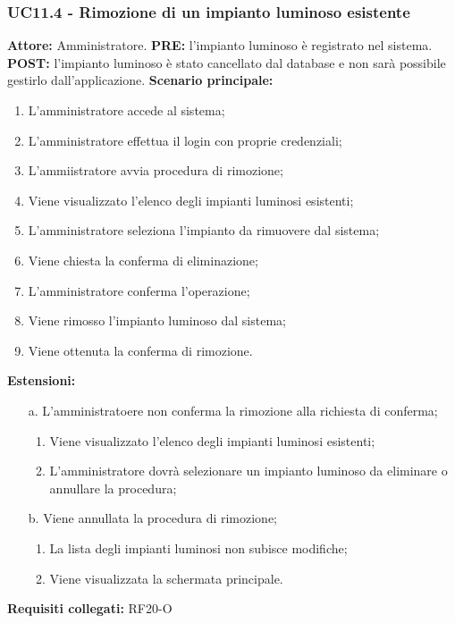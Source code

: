 \documentclass[a4paper, 12pt]{article}
\begin{document}
\subsubsection{UC11.4 - Rimozione di un impianto luminoso esistente}
\textbf{Attore:} Amministratore.\newline
\textbf{PRE:} l'impianto luminoso è registrato nel sistema.\newline
\textbf{POST:} l'impianto luminoso è stato cancellato dal database e non sarà possibile gestirlo dall'applicazione.\newline
\textbf{Scenario principale:}
\begin{enumerate}
    \item L'amministratore accede al sistema;
    \item L'amministratore effettua il login con proprie credenziali;
    \item L'ammiistratore avvia procedura di rimozione;
    \item Viene visualizzato l'elenco degli impianti luminosi esistenti;
    \item L'amministratore seleziona l'impianto da rimuovere dal sistema;
    \item Viene chiesta la conferma di eliminazione;
    \item L'amministratore conferma l'operazione;
    \item Viene rimosso l'impianto luminoso dal sistema;
    \item Viene ottenuta la conferma di rimozione.
\end{enumerate}
\textbf{Estensioni:}
\begin{itemize}
    \item [a.] L'amministratoere non conferma la rimozione alla richiesta di conferma;
    \begin{enumerate}
        \item Viene visualizzato l'elenco degli impianti luminosi esistenti;
        \item L'amministratore dovrà selezionare un impianto luminoso da eliminare o annullare la procedura;
    \end{enumerate}
    \item [b.] Viene annullata la procedura di rimozione;
    \begin{enumerate}
        \item La lista degli impianti luminosi non subisce modifiche;
        \item Viene visualizzata la schermata principale.
    \end{enumerate}
\end{itemize}
\textbf{Requisiti collegati:} RF20-O\newline
\end{document}
